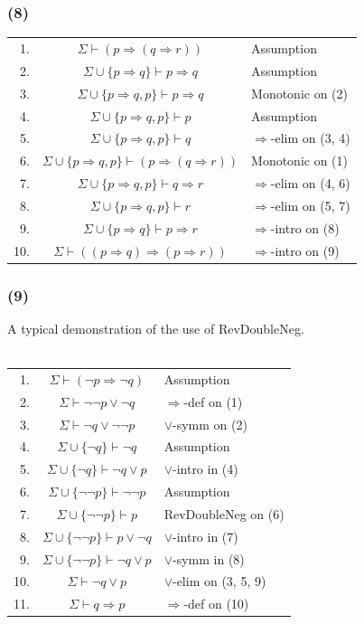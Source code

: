 \documentclass{article}
\begin{document}
\subsubsection*{(8)}
\begin{tabular}{r c l}
    1. & $\Sigma\vdash(p\Rightarrow(q\Rightarrow r))$ & Assumption\\
    2. & $\Sigma\cup\{p\Rightarrow q\}\vdash p\Rightarrow q$ & Assumption\\
    3. & $\Sigma\cup\{p\Rightarrow q, p\}\vdash p\Rightarrow q$ & Monotonic on (2)\\
    4. & $\Sigma\cup\{p\Rightarrow q, p\}\vdash p$ & Assumption\\
    5. & $\Sigma\cup\{p\Rightarrow q, p\}\vdash  q$ & $\Rightarrow$-elim on (3, 4)\\
    6. & $\Sigma\cup\{p\Rightarrow q, p\}\vdash  (p\Rightarrow(q\Rightarrow r))$ & Monotonic on (1)\\
    7. & $\Sigma\cup\{p\Rightarrow q, p\}\vdash  q\Rightarrow r$ &$\Rightarrow$-elim on (4, 6)\\
    8. & $\Sigma\cup\{p\Rightarrow q, p\}\vdash  r$ &$\Rightarrow$-elim on (5, 7)\\
    9. & $\Sigma\cup\{p\Rightarrow q\}\vdash  p\Rightarrow r$ &$\Rightarrow$-intro on (8)\\
    10. & $\Sigma\vdash  ((p\Rightarrow q)\Rightarrow (p\Rightarrow r))$ &$\Rightarrow$-intro on (9)\\
\end{tabular}
\subsubsection*{(9)}
A typical demonstration of the use of RevDoubleNeg.\\
\\
\begin{tabular}{r c l}
    1. & $\Sigma\vdash(\lnot p\Rightarrow \lnot q)$ & Assumption\\
    2. & $\Sigma\vdash \lnot\lnot p\lor \lnot q$ & $\Rightarrow$-def on (1)\\
    3. & $\Sigma\vdash \lnot q\lor \lnot\lnot p$ & $\lor$-symm on (2)\\
    4. & $\Sigma\cup\{\lnot q\}\vdash \lnot q$ & Assumption\\
    5. & $\Sigma\cup\{\lnot q\}\vdash \lnot q\lor p$ & $\lor$-intro in (4)\\
    6. & $\Sigma\cup\{\lnot\lnot p\}\vdash  \lnot\lnot p$ & Assumption\\
    7. & $\Sigma\cup\{\lnot\lnot p\}\vdash   p$ & RevDoubleNeg on (6)\\
    8. & $\Sigma\cup\{\lnot\lnot p\}\vdash   p\lor\lnot q$ & $\lor$-intro in (7)\\
    9. & $\Sigma\cup\{\lnot\lnot p\}\vdash   \lnot q\lor p$ & $\lor$-symm in (8)\\
    10. & $\Sigma\vdash  \lnot q\lor p$ & $\lor$-elim on (3, 5, 9)\\
    11. & $\Sigma\vdash  q\Rightarrow p$ & $\Rightarrow$-def on (10)\\
\end{tabular}
\end{document}
